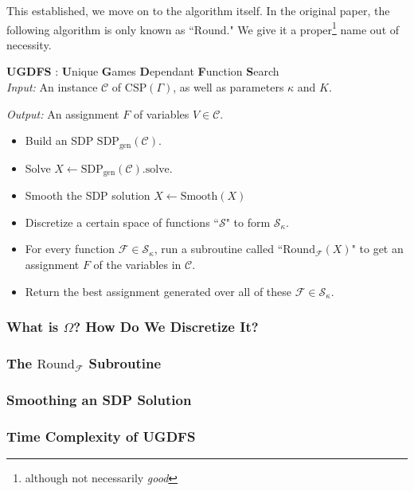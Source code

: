 This established, we move on to the algorithm itself. In the original paper, the following algorithm is only known as ``Round." We give it a proper\footnote{although not necessarily \textit{good}} name out of necessity.

\begin{algorithm} \textbf{UGDFS} : \textbf{U}nique \textbf{G}ames \textbf{D}ependant \textbf{F}unction \textbf{S}earch \\

\textit{Input: } An instance $\mathcal{C}$ of $\text{CSP}(\Gamma)$, as well as parameters $\kappa$ and $K$.

\textit{Output: } An assignment $F$ of variables $V \in \mathcal{C}$.
\begin{itemize}
\item Build an SDP $\text{SDP}_{\text{gen}}(\mathcal{C})$.
\item Solve $X \leftarrow \text{SDP}_{\text{gen}}(\mathcal{C}).\text{solve}$.
\item Smooth the SDP solution $X \leftarrow \text{Smooth}(X)$
\item Discretize a certain space of functions ``$\mathcal{S}$" to form $\mathcal{S}_{\kappa}$.
\item For every function $\mathcal{F} \in \mathcal{S}_{\kappa}$, run a subroutine called ``$\text{Round}_{\mathcal{F}}(X)$" to get an assignment $F$ of the variables in $\mathcal{C}$. 
\item Return the best assignment generated over all of these $\mathcal{F} \in \mathcal{S}_{\kappa}$.
\end{itemize}
\end{algorithm}

\subsubsection{What is $\Omega$? How Do We Discretize It?}

\subsubsection{The $\text{Round}_{\mathcal{F}}$ Subroutine}

\subsubsection{Smoothing an SDP Solution}

\subsubsection{Time Complexity of UGDFS}

